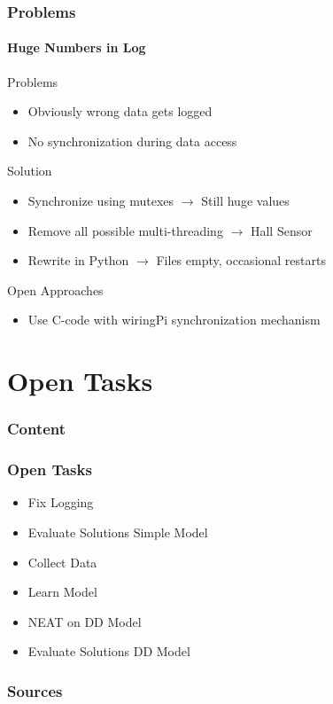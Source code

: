 \documentclass[8pt]{beamer}
\begin{document}
\begin{frame}
	\frametitle{Problems}
	\framesubtitle{Huge Numbers in Log}
	\begin{block}{Problems}
		\begin{itemize}
			\item Obviously wrong data gets logged
			\item No synchronization during data access
		\end{itemize}
	\end{block}
	\pause
	\begin{block}{Solution}
		\begin{itemize}[<+->]
			\item Synchronize using mutexes $\rightarrow$ Still huge values
			\item Remove all possible multi-threading $\rightarrow$ Hall Sensor
			\item Rewrite in Python $\rightarrow$ Files empty, occasional restarts
		\end{itemize}
	\end{block}	
	\pause
	\begin{block}{Open Approaches}
		\begin{itemize}
			\item Use C-code with wiringPi synchronization mechanism
		\end{itemize}
	\end{block}
\end{frame}

\section{Open Tasks}
\begin{frame}
	\frametitle{Content}
\end{frame}

\begin{frame}
	\frametitle{Open Tasks}
	\begin{block}{}
		\begin{itemize}
			\item Fix Logging
			\item Evaluate Solutions Simple Model
			\item Collect Data
			\item Learn Model
			\item NEAT on DD Model
			\item Evaluate Solutions DD Model
		\end{itemize}
	\end{block}
\end{frame}

\begin{frame}[allowframebreaks]
\frametitle{Sources}



\end{frame}
\end{document}
